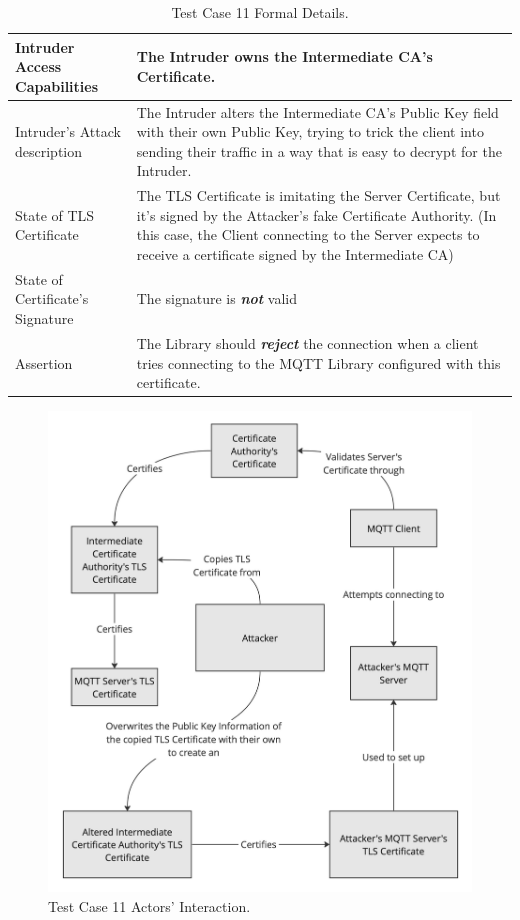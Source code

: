 \documentclass[binding=0.6cm,noexaminfo]{sapthesis}
\begin{document}
\begin{table}
\begin{center}
\begin{tabular}{| p{6cm} | p{6cm} |}
\hline
Intruder Access Capabilities & The Intruder owns the Intermediate CA’s Certificate. \\
\hline
Intruder’s Attack description & The Intruder alters the Intermediate CA’s Public Key field with their own Public Key, trying to trick the client into sending their traffic in a way that is easy to decrypt for the Intruder. \\
\hline
State of TLS Certificate & The TLS Certificate is imitating the Server Certificate, but it’s signed by the Attacker’s fake Certificate Authority. (In this case, the Client connecting to the Server expects to receive a certificate signed by the Intermediate CA) \\
\hline
State of Certificate’s Signature & The signature is \textbf{\textit{not}} valid \\
\hline
Assertion & The Library should \textbf{\textit{reject}} the connection when a client tries connecting to the MQTT Library configured with this certificate. \\
\hline
\end{tabular}
\caption{Test Case 11 Formal Details.}
\label{tab:tc11}
\end{center}
\end{table}

\begin{figure}[htb]
	\includegraphics[width=14cm]{TC11}
	\caption{Test Case 11 Actors' Interaction.}
	\label{fig:tc11}
\end{figure}
\end{document}
